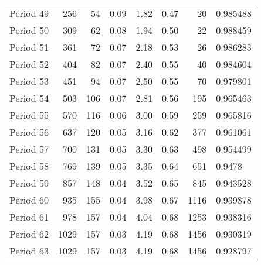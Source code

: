 \begin{tabular}{lrrrrrrl}
Period 49 &                     256 &          54 &        0.09 &        1.82 &        0.47 &          20 &   0.985488 \\
Period 50 &                     309 &          62 &        0.08 &        1.94 &        0.50 &          22 &   0.988459 \\
Period 51 &                     361 &          72 &        0.07 &        2.18 &        0.53 &          26 &   0.986283 \\
Period 52 &                     404 &          82 &        0.07 &        2.40 &        0.55 &          40 &   0.984604 \\
Period 53 &                     451 &          94 &        0.07 &        2.50 &        0.55 &          70 &   0.979801 \\
Period 54 &                     503 &         106 &        0.07 &        2.81 &        0.56 &         195 &   0.965463 \\
Period 55 &                     570 &         116 &        0.06 &        3.00 &        0.59 &         259 &   0.965816 \\
Period 56 &                     637 &         120 &        0.05 &        3.16 &        0.62 &         377 &   0.961061 \\
Period 57 &                     700 &         131 &        0.05 &        3.30 &        0.63 &         498 &   0.954499 \\
Period 58 &                     769 &         139 &        0.05 &        3.35 &        0.64 &         651 &     0.9478 \\
Period 59 &                     857 &         148 &        0.04 &        3.52 &        0.65 &         845 &   0.943528 \\
Period 60 &                     935 &         155 &        0.04 &        3.98 &        0.67 &        1116 &   0.939878 \\
Period 61 &                     978 &         157 &        0.04 &        4.04 &        0.68 &        1253 &   0.938316 \\
Period 62 &                    1029 &         157 &        0.03 &        4.19 &        0.68 &        1456 &   0.930319 \\
Period 63 &                    1029 &         157 &        0.03 &        4.19 &        0.68 &        1456 &   0.928797 \\
\bottomrule
\end{tabular}
